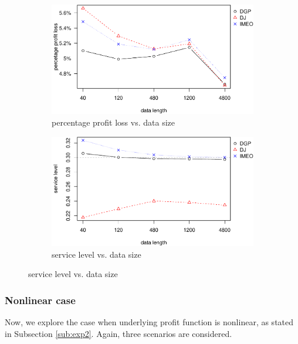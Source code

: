 \documentclass{article}
\begin{document}
\begin{figure}[ht]
\centering
\caption{Performance vs. sample size with Laplace distributed error term}
\begin{subfigure}[b]{0.48\textwidth}
\centering
\includegraphics[width=\textwidth]{runif-plot_files/figure-latex/ppl-1.pdf}
\caption{percentage profit loss vs. data size}
\end{subfigure}
\hfill
\begin{subfigure}[b]{0.48\textwidth}
\centering
\includegraphics[width=\textwidth]{runif-plot_files/figure-latex/sl-1.pdf}
\caption{service level vs. data size}
\end{subfigure}
\label{fig:err}
\end{figure}

\subsubsection{Nonlinear case}

Now, we explore the case when underlying profit function is nonlinear, as stated in Subsection \ref{sub:exp2}. Again, three scenarios are considered.
\end{document}
